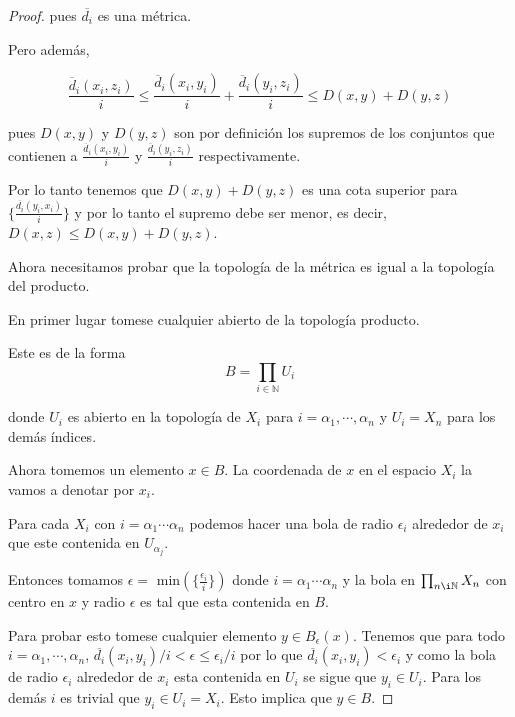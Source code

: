 \documentclass[letter,twoside,12pt]{article}
\begin{document}
\begin{enumerate}
\begin{proof}
pues $ \overline{d_i} $ es una métrica.

Pero además,

\begin{equation}
\frac{\overline{d}_i(x_i,z_i)}{i}\leq \frac{\overline{d}_i(x_i,y_i)}{i}+\frac{\overline{d}_i(y_i,z_i)}{i}  \leq D(x,y)+D(y,z)\nonumber
\end{equation}

pues $ D(x,y) $ y $ D(y,z) $ son por definición los supremos de los conjuntos que contienen a $ \frac{\overline{d}_i(x_i,y_i)}{i} $ y $ \frac{\overline{d}_i(y_i,z_i)}{i} $ respectivamente.

Por lo tanto tenemos que $ D(x,y) + D(y,z)$ es una cota superior para $ \Big\{\frac{\overline{d_i}(y_i,x_i)}{i}\Big\} $ y por lo tanto el supremo debe ser menor, es decir, $ D(x,z) \leq D(x,y)+D(y,z) $. 

Ahora necesitamos probar que la topología de la métrica es igual a la topología del producto.

En primer lugar tomese cualquier abierto de la topología producto.

Este es de la forma
\begin{equation}
B=\prod_{i \in \mathbb{N}} U_i \nonumber
\end{equation}

donde $ U_i $ es abierto en la topología de $ X_i $ para $ i = \alpha_1, \cdots, \alpha_n $ y $U_i=X_n$ para los demás índices.

Ahora tomemos un elemento $ x \in B $. La coordenada de $ x $ en el espacio $ X_i $ la vamos a denotar por $ x_i $.

Para cada $X_{i} $ con $ i = \alpha_1 \cdots \alpha_n $ podemos hacer una bola de radio $ \epsilon_{i} $ alrededor de $ x_{i}
 $ que este contenida en $ U_{\alpha_j} $. 

Entonces tomamos $ \epsilon = $ min$ (\{\frac{\epsilon_{i}}{i}\}) $ donde $ i = \alpha_1 \cdots \alpha_n $ y la bola en $\prod_{n \i \mathbb{N}}X_n$ con centro en $ x $ y radio $ \epsilon $ es tal que esta contenida en $ B $.

Para probar esto tomese cualquier elemento $y \in B_{\epsilon}(x)$. Tenemos que para todo $ i = \alpha_1, \cdots, \alpha_n$, $ \overline{d_i}(x_i,y_i)/i<\epsilon\leq\epsilon_i/i $ por lo que $ \overline{d_i}(x_i,y_i) < \epsilon_i$ y como la bola de radio $ \epsilon_i $ alrededor de $ x_i $ esta contenida en $ U_i $ se sigue que $y_i \in U_i$. Para los demás $ i $ es trivial que $ y_i \in U_i =X_i $. Esto implica que $y \in B$.


\end{proof}
\end{enumerate}
\end{document}

